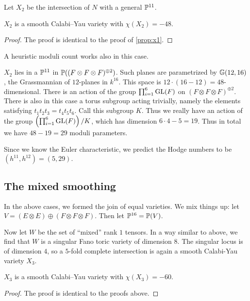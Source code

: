 Let $X_2$ be the intersection of $N$ with a general $\P^{11}$.

\begin{proposition}
\label{prop:x2}
$X_2$ is a smooth Calabi--Yau variety with $\chi(X_2)=-48$.
\end{proposition}
\begin{proof}
The proof is identical to the proof of \cref{prop:x1}.
\end{proof}

\begin{remark}
A heuristic moduli count works also in this case.

$X_2$ lies in a $\P^{11}$ in $\P((F \otimes F \otimes F)^{\oplus 2})$. Such planes are parametrized by $\Gr(12,16)$, the Grassmannian of $12$-planes in $k^{16}$. This space is $12 \cdot (16-12)=48$-dimensional. There is an action of the group $\prod_{i=1}^6 \GL(F)$ on $(F \otimes F \otimes F)^{\oplus 2}$. There is also in this case a torus subgroup acting trivially, namely the elements satisfying $t_1t_2t_3=t_4t_5t_6$. Call this subgroup $K$. Thus we really have an action of the group $\left(\prod_{i=1}^6 \GL(F)\right)/K$, which has dimension $6 \cdot 4 - 5 = 19$. Thus in total we have $48-19=29$ moduli parameters.

Since we know the Euler characteristic, we predict the Hodge numbers to be $(h^{11},h^{12})=(5,29)$.
\end{remark}

\subsection{The mixed smoothing}

In the above cases, we formed the join of equal varieties. We mix things up: let $V=(E \otimes E) \oplus (F \otimes F \otimes F)$. Then let $\P^{16}=\P(V)$.

Now let $W$ be the set of ``mixed'' rank $1$ tensors. In a way similar to above, we find that $W$ is a singular Fano toric variety of dimension $8$. The singular locus is of dimension $4$, so a $5$-fold complete intersection is again a smooth Calabi-Yau variety $X_3$.

\begin{proposition}
\label{prop:x3}
$X_3$ is a smooth Calabi--Yau variety with $\chi(X_3)=-60$.
\end{proposition}
\begin{proof}
The proof is identical to the proofs above.
\end{proof}

